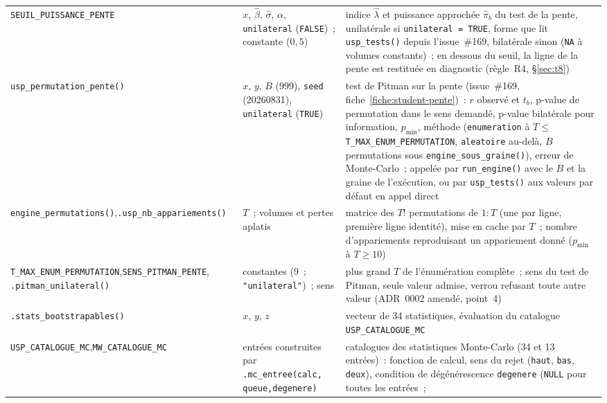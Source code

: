 \documentclass[a4paper,11pt]{article}
\newcommand{\code}[1]{\texttt{\small #1}}
\begin{document}
{\begin{longtable}{@{}p{4.6cm}p{4.0cm}p{6.2cm}@{}}
\code{SEUIL\_PUISSANCE\_PENTE} & $x$, $\hat\beta$, $\hat\sigma$, $\alpha$,
\code{unilateral} (\code{FALSE})~; constante ($0{,}5$) & indice $\hat\lambda$ et puissance
approchée $\hat\pi_b$ du test de la pente, unilatérale si \code{unilateral = TRUE}, forme que lit
\code{usp\_tests()} depuis l'issue~\#169, bilatérale sinon (\code{NA} à volumes
constants)~; en dessous du seuil, la ligne de la pente est restituée en diagnostic (règle~R4,
§\ref{sec:t8}) \\
\code{usp\_permutation\_}\newline\code{pente()} & $x$, $y$, $B$ (999), \code{seed}
(20260831), \code{unilateral} (\code{TRUE}) & test de Pitman sur la pente (issue~\#169,
fiche~\ref{fiche:student-pente})~: $r$ observé et $t_b$, p-value de permutation dans le sens
demandé, p-value bilatérale pour information, $p_{\min}$, méthode (\code{enumeration} à
$T \le$ \code{T\_MAX\_ENUM\_PERMUTATION}, \code{aleatoire} au-delà, $B$ permutations sous
\code{engine\_sous\_graine()}), erreur de Monte-Carlo~; appelée par \code{run\_engine()} avec le
$B$ et la graine de l'exécution, ou par \code{usp\_tests()} aux valeurs par défaut en appel
direct \\
\code{engine\_permutations()},\newline \code{.usp\_nb\_appariements()} & $T$~; volumes et pertes
aplatis & matrice des $T!$ permutations de $1{:}T$ (une par ligne, première ligne identité), mise
en cache par $T$~; nombre d'appariements reproduisant un appariement donné ($p_{\min}$ à
$T \ge 10$) \\
\code{T\_MAX\_ENUM\_}\newline\code{PERMUTATION},\newline \code{SENS\_PITMAN\_PENTE},\newline
\code{.pitman\_unilateral()} & constantes ($9$~; \code{"unilateral"})~; sens & plus grand $T$
de l'énumération complète~; sens du test de Pitman, seule valeur admise, verrou refusant toute
autre valeur (ADR~0002 amendé, point~4) \\
\code{.stats\_bootstrapables()} & $x$, $y$, $z$ & vecteur de 34 statistiques, évaluation
du catalogue \code{USP\_CATALOGUE\_MC} \\
\code{USP\_CATALOGUE\_MC},\newline \code{MW\_CATALOGUE\_MC} & entrées construites par
\code{.mc\_entree(calc, queue,}\newline\code{degenere)} & catalogues des statistiques
Monte-Carlo (34 et 13 entrées)~: fonction de calcul, sens du rejet (\code{haut}, \code{bas},
\code{deux}), condition de dégénérescence \code{degenere} (\code{NULL} pour toutes les entrées~;

\end{longtable}}
\end{document}

